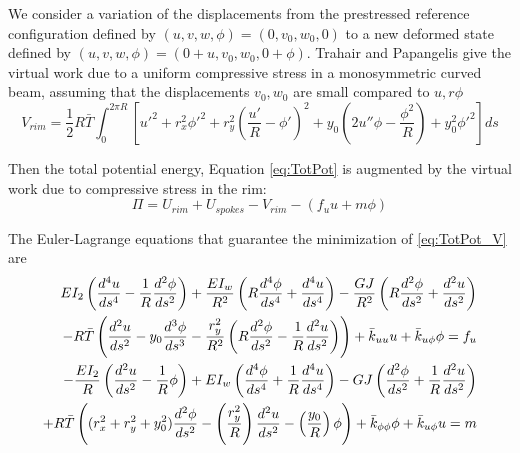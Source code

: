 \documentclass[\rootdir/thesis.tex]{subfiles}
\begin{document}
We consider a variation of the displacements from the prestressed reference configuration defined by $(u,v,w,\phi)=(0,v_0,w_0,0)$ to a new deformed state defined by $(u,v,w,\phi)=(0+u,v_0,w_0,0+\phi)$. Trahair and Papangelis\cite{Trahair} give the virtual work due to a uniform compressive stress in a monosymmetric curved beam, assuming that the displacements $v_0,w_0$ are small compared to $u,r\phi$
\begin{equation}
\label{eq:V_rim}
V_{rim} = \frac{1}{2}R\bar{T} \int_0^{2\pi R}
    \left[u'^2 + r_x^2\phi'^2+r_y^2\left(\frac{u'}{R}-\phi'\right)^2
          +y_0\left(2u''\phi-\frac{\phi^2}{R}\right) + y_0^2\phi'^2 \right] ds
\end{equation}

Then the total potential energy, Equation \ref{eq:TotPot} is augmented by the virtual work due to compressive stress in the rim:
\begin{equation}
\label{eq:TotPot_V}
\Pi = U_{rim} + U_{spokes} - V_{rim} - (f_uu+m\phi)
\end{equation}

The Euler-Lagrange equations that guarantee the minimization of \eqref{eq:TotPot_V} are
\begin{subequations}
\label{eq:lat_ode_2}
\begin{align}
\begin{split}
  EI_2\left( \frac{d^4u}{ds^4} - \frac{1}{R}\frac{d^2\phi}{ds^2} \right)
  + \frac{EI_w}{R^2}\left( R\frac{d^4\phi}{ds^4} + \frac{d^4u}{ds^4} \right)
  - \frac{GJ}{R^2}\left( R\frac{d^2\phi}{ds^2} + \frac{d^2u}{ds^2} \right)\\
  - R\bar{T}\left( \frac{d^2u}{ds^2} - y_0\frac{d^3\phi}{ds^3}
                  -\frac{r_y^2}{R^2}\left(R\frac{d^2\phi}{ds^2}
                  -\frac{1}{R}\frac{d^2u}{ds^2}\right) \right)
  + \bar{k}_{uu} u + \bar{k}_{u\phi} \phi = f_u
\end{split}\\
\begin{split}
  - \frac{EI_2}{R}\left( \frac{d^2u}{ds^2} - \frac{1}{R}\phi \right)
  + EI_w\left( \frac{d^4\phi}{ds^4} + \frac{1}{R}\frac{d^4u}{ds^4} \right)
  - GJ\left( \frac{d^2\phi}{ds^2} + \frac{1}{R}\frac{d^2u}{ds^2} \right)\\
  + R\bar{T}\left((r_x^2+r_y^2+y_0^2)\frac{d^2\phi}{ds^2}
                  -\left(\frac{r_y^2}{R}\right)\frac{d^2u}{ds^2}
                  -\left(\frac{y_0}{R}\right)\phi\right)
  + \bar{k}_{\phi\phi} \phi + \bar{k}_{u\phi} u = m
\end{split}
\end{align}
\end{subequations}
\end{document}
